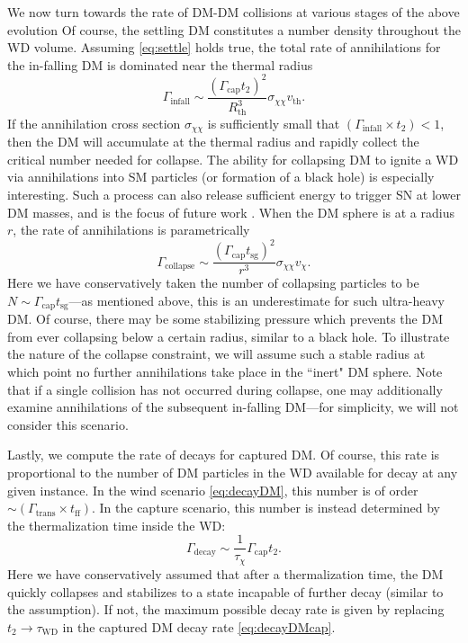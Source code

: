 We now turn towards the rate of DM-DM collisions at various stages of the above evolution
Of course, the settling DM constitutes a number density throughout the WD volume.
Assuming \eqref{eq:settle} holds true, the total rate of annihilations for the in-falling DM is dominated near the thermal radius
\begin{equation}
\label{eq:infall}
\Gamma_\text{infall} \sim \frac{(\Gamma_\text{cap} t_2)^2}{R_\text{th}^3} \sigma_{\chi \chi} v_\text{th}. 
\end{equation}
If the annihilation cross section $\sigma_{\chi \chi}$ is sufficiently small that $(\Gamma_\text{infall} \times t_2) < 1$, then the DM will accumulate at the thermal radius and rapidly collect the critical number needed for collapse. 
The ability for collapsing DM to ignite a WD via annihilations into SM particles (or formation of a black hole) is especially interesting. 
Such a process can also release sufficient energy to trigger SN at lower DM masses, and is the focus of future work \cite{us}.
When the DM sphere is at a radius $r$, the rate of annihilations is parametrically
\begin{equation}
\Gamma_\text{collapse} \sim \frac{(\Gamma_\text{cap} t_\text{sg})^2}{r^3} \sigma_{\chi \chi} v_\chi. 
\end{equation}
Here we have conservatively taken the number of collapsing particles to be $N \sim \Gamma_\text{cap} t_\text{sg}$---as mentioned above, this is an underestimate for such ultra-heavy DM.
Of course, there may be some stabilizing pressure which prevents the DM from ever collapsing below a certain radius, similar to a black hole. 
To illustrate the nature of the collapse constraint, we will assume such a stable radius at which point no further annihilations take place in the ``inert" DM sphere. 
Note that if a single collision has not occurred during collapse, one may additionally examine annihilations of the subsequent in-falling DM---for simplicity, we will not consider this scenario. 

Lastly, we compute the rate of decays for captured DM.  
Of course, this rate is proportional to the number of DM particles in the WD available for decay at any given instance.  
In the wind scenario \eqref{eq:decayDM}, this number is of order $\sim (\Gamma_\text{trans} \times t_\text{ff})$.  
In the capture scenario, this number is instead determined by the thermalization time inside the WD:
\begin{equation}
\Gamma_\text{decay} \sim  \frac{1}{\tau_\chi} \Gamma_\text{cap} t_2.
\label{eq:decayDMcap}
\end{equation}
Here we have conservatively assumed that after a thermalization time, the DM quickly collapses and stabilizes to a state incapable of further decay (similar to the assumption).
If not, the maximum possible decay rate is given by replacing $t_2 \to \tau_\text{WD}$ in the captured DM decay rate \eqref{eq:decayDMcap}.